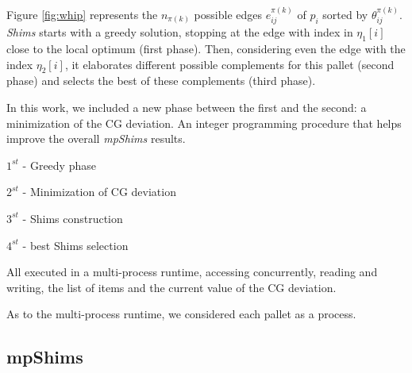 \documentclass[preprint,authoryear]{elsarticle}
\begin{document}
\begin{table}[H]
\begin{minipage}{0.58\linewidth}
		\label{fig:whip}		
	\end{minipage}
\end{table}


Figure \ref{fig:whip} represents the $n_{\pi(k)}$\/ possible edges $e_{ij}^{\pi(k)}$\/ of $p_i$\/ sorted by $\theta_{ij}^{\pi(k)}$. \emph{Shims}\/ starts with a greedy solution, stopping at the edge with index in $\eta_1[i]$ close to the local optimum (first phase). Then, considering even the edge with the index $\eta_2[i]$, it elaborates different possible complements for this pallet (second phase) and selects the best of these complements (third phase).

{\color{blue} In this work, we included a new phase between the first and the second: a minimization of the CG deviation. An integer programming procedure that helps improve the overall {\it mpShims} results.

$1^{st}$ - Greedy phase

$2^{st}$ - Minimization of CG deviation

$3^{st}$ - Shims construction

$4^{st}$ - best Shims selection

All executed in a multi-process runtime, accessing concurrently, reading and writing, the list of items and the current value of the CG deviation.

As to the multi-process runtime, we considered each pallet as a process.
}


\subsection{mpShims}
\end{document}
